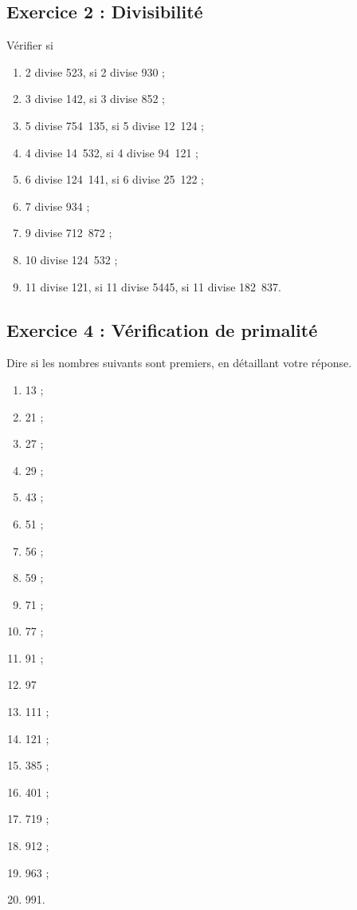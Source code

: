 \documentclass[14 pt]{extarticle}
\theoremstyle{plain}
\begin{document}
  \subsection*{Exercice 2 : Divisibilité}
Vérifier si \begin{enumerate}
\item 2 divise 523, si 2 divise 930 ;
\item 3 divise 142, si 3 divise 852 ;
\item 5 divise 754~135, si 5 divise 12~124 ;
\item 4 divise 14~532, si 4 divise 94~121 ;
\item 6 divise 124~141, si 6 divise 25~122 ;
\item 7 divise 934 ;
\item 9 divise 712~872 ;
\item 10 divise 124~532 ;
\item 11 divise 121, si 11 divise 5445, si 11 divise 182~837.
\end{enumerate}



  \subsection*{Exercice 4 : Vérification de primalité}
Dire si les nombres suivants sont premiers, en détaillant votre réponse. 
\begin{enumerate}
\item 13 ;
\item 21 ;
\item 27 ; 
\item 29 ; 
\item 43 ; 
\item 51 ; 
\item 56 ;
\item 59 ; 
\item 71 ;
\item 77 ; 
\item 91 ;
\item 97
\item 111 ; 
\item 121 ; 
\item 385 ; 
\item 401 ; 
\item 719 ; 
\item 912 ; 
\item 963 ; 
\item 991. 
\end{enumerate}
\end{document}
